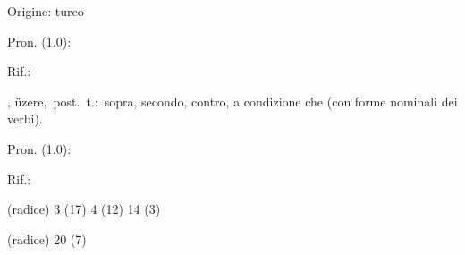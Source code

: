 \begin{glossario}{Origine: turco}
\begin{subvocedue}
\item[Pron. (1.0):] 
\item[Rif.:] 
\end{subvocedue}
\begin{subvocedue}
\item[\subglossariobullet] , {\sf üzere},\ post.\ t.:\ sopra, secondo, contro, a condizione che (con forme nominali dei verbi).
\begin{subvocedue}
\item[Pron. (1.0):] 
\item[Rif.:] 
\end{subvocedue}
\item[(radice)]   3 (17) 4 (12) 14 (3)
\item[(radice)]   20 (7)
\end{subvocedue}



\end{glossario}
